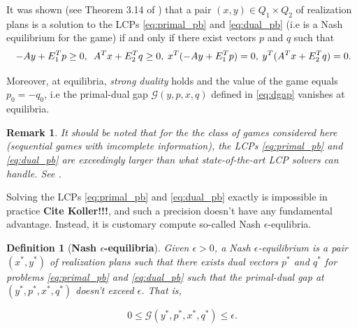 \documentclass{article} %
\newtheorem{definition}[theorem]{Definition}
\newtheorem{remark}{Remark}
\begin{document}
It was shown (see Theorem 3.14 of \cite{vonequilibrium}) that a pair
$(x, y) \in Q_1 \times Q_2$ of realization plans is a solution to the
LCPs \eqref{eq:primal_pb} and \eqref{eq:dual_pb} (i.e is a Nash
equilibrium for the game)  if and only if there exist vectors $p$ and
$q$ such that
\begin{equation}
\hspace{.25em} -Ay + E_1^Tp \ge 0, \hspace{.5em}A^Tx + E_2^Tq \ge
0, \hspace{.25em} x^T(-Ay + E_1^Tp) = 0, \hspace{.25em} y^T(A^Tx +
E_2^Tq) = 0.
\label{eq:feasibility}
\end{equation}

Moreover, at equilibria, \textit{strong duality} holds and the value
of the game equals $p_0 = -q_0$, i.e the primal-dual gap
$\mathcal{G}(y, p, x, q)$ defined in \eqref{eq:dgap} vanishes at
equilibria.



\begin{remark}  
It should be noted that for the the class of games considered here (sequential games with imcomplete information), the LCPs \eqref{eq:primal_pb} and \eqref{eq:dual_pb} are exceedingly larger than what state-of-the-art LCP solvers can handle. See \cite{hoda2010smoothing}.
\end{remark}

Solving the LCPs \eqref{eq:primal_pb} and \eqref{eq:dual_pb} exactly is impossible in practice \textbf{Cite Koller!!!}, and such a precision doesn't have any fundamental advantage. Instead, it is customary compute so-called Nash $\epsilon$-equlibria.

\begin{definition}[\textbf{Nash $\epsilon$-equilibria}]
Given $\epsilon > 0$, a Nash $\epsilon$-equilibrium is
a pair $(x^*, y^*)$ of realization plans such that there exists dual
vectors $p^*$ and $q^*$ for problems \eqref{eq:primal_pb} and
\eqref{eq:dual_pb} such that the primal-dual gap at $(y^*, p^*, x^*, q^*)$
doesn't exceed $\epsilon$. That is,

\begin{equation}
  0 \le \mathcal{G}(y^*, p^*, x^*, q^*) \le \epsilon.
\label{eq:approx_pb}
\end{equation}
\label{thm:approx_nash}
\end{definition}
\end{document}
